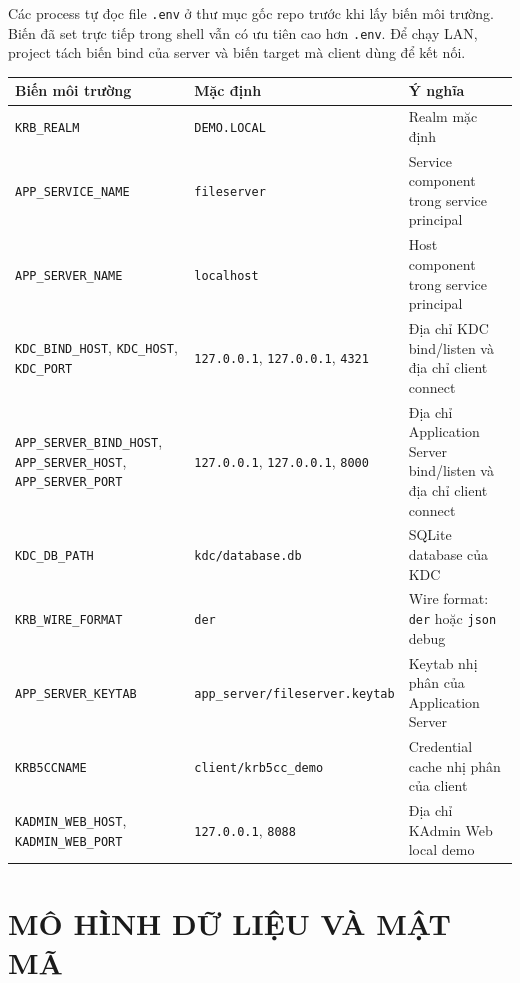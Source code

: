 \documentclass[12pt]{article}
\begin{document}
Các process tự đọc file \texttt{.env} ở thư mục gốc repo trước khi lấy biến môi trường. Biến đã set trực tiếp trong shell vẫn có ưu tiên cao hơn \texttt{.env}. Để chạy LAN, project tách biến bind của server và biến target mà client dùng để kết nối.

\begin{table}[H]
\centering
\renewcommand{\arraystretch}{1.25}
\begin{tabularx}{\textwidth}{|p{3.55cm}|p{7cm}|X|}
\hline
\textbf{Biến môi trường} & \textbf{Mặc định} & \textbf{Ý nghĩa} \\
\hline
\texttt{KRB\_REALM} & \texttt{DEMO.LOCAL} & Realm mặc định \\
\hline
\texttt{APP\_SERVICE\_NAME} & \texttt{fileserver} & Service component trong service principal \\
\hline
\texttt{APP\_SERVER\_NAME} & \texttt{localhost} & Host component trong service principal \\
\hline
\texttt{KDC\_BIND\_HOST}, \texttt{KDC\_HOST}, \texttt{KDC\_PORT} & \texttt{127.0.0.1}, \texttt{127.0.0.1}, \texttt{4321} & Địa chỉ KDC bind/listen và địa chỉ client connect \\
\hline
\texttt{APP\_SERVER\_BIND\_HOST}, \texttt{APP\_SERVER\_HOST}, \texttt{APP\_SERVER\_PORT} & \texttt{127.0.0.1}, \texttt{127.0.0.1}, \texttt{8000} & Địa chỉ Application Server bind/listen và địa chỉ client connect \\
\hline
\texttt{KDC\_DB\_PATH} & \texttt{kdc/database.db} & SQLite database của KDC \\
\hline
\texttt{KRB\_WIRE\_FORMAT} & \texttt{der} & Wire format: \texttt{der} hoặc \texttt{json} debug \\
\hline
\texttt{APP\_SERVER\_KEYTAB} & \texttt{app\_server/fileserver.keytab} & Keytab nhị phân của Application Server \\
\hline
\texttt{KRB5CCNAME} & \texttt{client/krb5cc\_demo} & Credential cache nhị phân của client \\
\hline
\texttt{KADMIN\_WEB\_HOST}, \texttt{KADMIN\_WEB\_PORT} & \texttt{127.0.0.1}, \texttt{8088} & Địa chỉ KAdmin Web local demo \\
\hline
\end{tabularx}
\end{table}

\section{MÔ HÌNH DỮ LIỆU VÀ MẬT MÃ}
\end{document}
